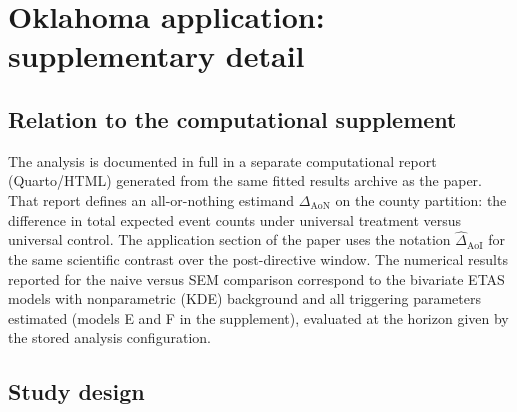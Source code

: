 
\section{Oklahoma application: supplementary detail}\label{app:oklahoma}

\subsection{Relation to the computational supplement}

The analysis is documented in full in a separate computational report (Quarto/HTML) generated from the same fitted results archive as the paper. That report defines an all-or-nothing estimand $\Delta_{\mathrm{AoN}}$ on the county partition: the difference in total expected event counts under universal treatment versus universal control. The application section of the paper uses the notation $\hat\Delta_{\mathrm{AoI}}$ for the same scientific contrast over the post-directive window. The numerical results reported for the naive versus SEM comparison correspond to the bivariate ETAS models with nonparametric (KDE) background and all triggering parameters estimated (models E and F in the supplement), evaluated at the horizon given by the stored analysis configuration.

\subsection{Study design}

